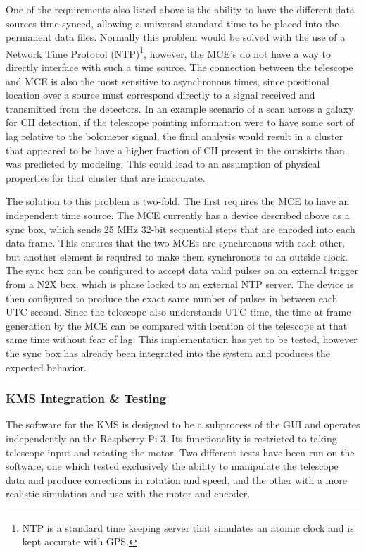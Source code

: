 \documentclass[manuscript]{aastex}
\begin{document}
One of the requirements also listed above is the ability to have the different data sources time-synced, allowing a universal standard time to be placed into the permanent data files. Normally this problem would be solved with the use of a Network Time Protocol (NTP)\footnote{ NTP is a standard time keeping server that simulates an atomic clock and is kept accurate with GPS.}, however, the MCE's do not have a way to directly interface with such a time source. The connection between the telescope and MCE is also the most sensitive to asynchronous times, since positional location over a source must correspond directly to a signal received and transmitted from the detectors. In an example scenario of a scan across a galaxy for CII detection, if the telescope pointing information were to have some sort of lag relative to the bolometer signal, the final analysis would result in a cluster that appeared to be have a higher fraction of CII present in the outskirts than was predicted by modeling. This could lead to an assumption of physical properties for that cluster that are inaccurate. 
 
The solution to this problem is two-fold. The first requires the MCE to have an independent time source. The MCE currently has a device described above as a sync box, which sends 25 MHz 32-bit sequential steps that are encoded into each data frame. This ensures that the two MCEs are synchronous with each other, but another element is required to make them synchronous to an outside clock.  The sync box can be configured to accept data valid pulses on an external trigger from a N2X box, which is phase locked to an external NTP server. The device is then configured to produce the exact same number of pulses in between each UTC second. Since the telescope also understands UTC time, the time at frame generation by the MCE can be compared with location of the telescope at that same time without fear of lag. This implementation has yet to be tested, however the sync box has already been integrated into the system and produces the expected behavior. 

\subsubsection{\textbf{KMS Integration \& Testing}}

The software for the KMS is designed to be a subprocess of the GUI and operates independently on the Raspberry Pi 3. Its functionality is restricted to taking telescope input and rotating the motor. Two different tests have been run on the software, one which tested exclusively the ability to manipulate the telescope data and produce corrections in rotation and speed, and the other with a more realistic simulation and use with the motor and encoder. 
\end{document}
